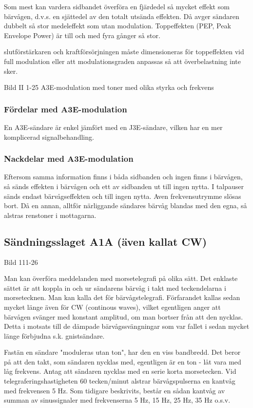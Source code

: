 \documentclass[a4paper,twoside,twocolumn,openright]{book}
\begin{document}
Som mest kan vardera sidbandet överföra en fjärdedel så mycket effekt som bärvågen, d.v.s.
en sjättedel av den totalt utsända effekten. Då avger sändaren dubbelt så stor medeleffekt
som utan modulation. Toppeffekten (PEP, Peak Envelope Power) är till och med fyra gånger
så stor.

slutförstärkaren och kraftförsörjningen måste dimensioneras för toppeffekten vid
full modulation eller att modulationsgraden anpassas så att överbelastning inte sker.

Bild II 1-25 A3E-modulation med toner med olika styrka och frekvens

\subsubsection{Fördelar med A3E-modulation}

En A3E-sändare är enkel jämfört med en J3E-sändare, vilken har en mer komplicerad
signalbehandling.

\subsubsection{Nackdelar med A3E-modulation}

Eftersom samma information finns i båda sidbanden och ingen finns i bärvågen, så sänds
effekten i bärvågen och ett av sidbanden ut till ingen nytta. I talpauser sänds endast
bärvågseffekten och till ingen nytta. Aven frekvensutrymme slösas bort. Då en annan,
alltför närliggande sändares bärvåg blandas med den egna, så alstras renstoner i
mottagarna.

\subsection{Sändningsslaget A1A (även kallat CW)}

Bild 111-26

Man kan överföra meddelanden med morsetelegrafi på olika sätt. Det enklaste sättet är att
koppla in och ur sändarens bärvåg i takt med teckendelarna i morsetecknen. Man kan kalla
det för bärvågstelegrafi. Förfarandet kallas sedan mycket länge även för CW (continous
waves), vilket egentligen anger att bärvågen svänger med konstant amplitud, om man bortser
från att den nycklas. Detta i motsats till de dämpade bärvågssvängningar som var fallet i
sedan mycket länge förbjudna s.k. gnistsändare.

Fastän en sändare "moduleras utan ton", har den en viss bandbredd. Det beror på att den
takt, som sändaren nycklas med, egentligen är en ton - låt vara med låg frekvens. Antag
att sändaren nycklas med en serie korta morsetecken. Vid telegraferingshastigheten
60 tecken/minut alstrar bärvågspulserna en kantvåg med frekvensen 5 Hz. Som tidigare
beskrivits, består en sådan kantvåg av summan av sinussignaler med frekvenserna 5 Hz,
15 Hz, 25 Hz, 35 Hz o.s.v.
\end{document}
